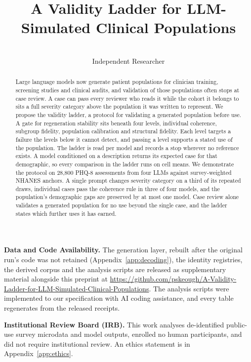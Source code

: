 \documentclass[wcp]{jmlr}
\title[A Validity Ladder for LLM-Simulated Clinical Populations]{A Validity Ladder for LLM-Simulated Clinical Populations}
\author{\begin{center}\Name{Patrick Keough}\\
 \addr Independent Researcher\end{center}}
\begin{document}
\maketitle
\begin{abstract}
Large language models now generate patient populations for clinician training, screening studies and clinical audits, and validation of those populations often stops at case review. A case can pass every reviewer who reads it while the cohort it belongs to sits a full severity category above the population it was written to represent. We propose the validity ladder, a protocol for validating a generated population before use. A gate for regeneration stability sits beneath four levels, individual coherence, subgroup fidelity, population calibration and structural fidelity. Each level targets a failure the levels below it cannot detect, and passing a level supports a stated use of the population. The ladder is read per model and records a stop wherever no reference exists. A model conditioned on a description returns its expected case for that demographic, so every comparison in the ladder runs on cell means. We demonstrate the protocol on 28,800 PHQ-8 assessments from four LLMs against survey-weighted NHANES anchors. A single prompt changes severity category on a third of its repeated draws, individual cases pass the coherence rule in three of four models, and the population's demographic gaps are preserved by at most one model. Case review alone validates a generated population for no use beyond the single case, and the ladder states which further uses it has earned.
\end{abstract}
\par\vspace{0.4\baselineskip}

\noindent\textbf{Data and Code Availability.} The generation layer, rebuilt after the original run's code was not retained (Appendix~\ref{app:decoding}), the identity registries, the derived corpus and the analysis scripts are released as supplementary material alongside this preprint at \url{https://github.com/pskeough/A-Validity-Ladder-for-LLM-Simulated-Clinical-Populations}. The analysis scripts were implemented to our specification with AI coding assistance, and every table regenerates from the released receipts.

\noindent\textbf{Institutional Review Board (IRB).} This work analyses de-identified public-use survey microdata and model outputs, enrolled no human participants, and did not require institutional review. An ethics statement is
in Appendix~\ref{app:ethics}.
\end{document}
